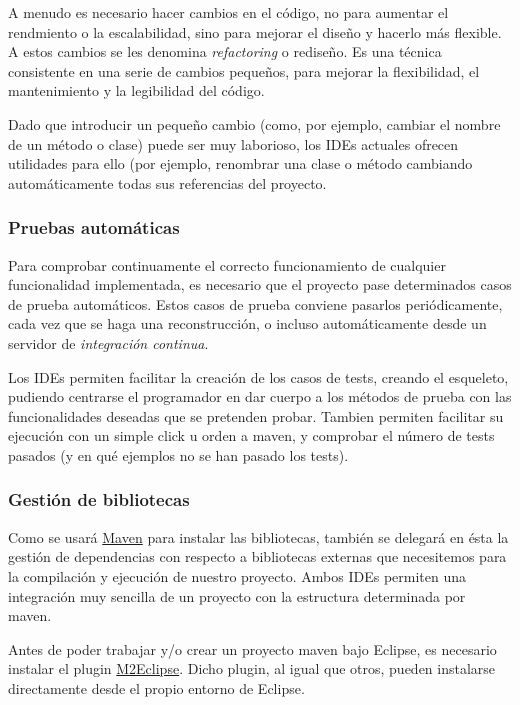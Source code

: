 \documentclass[11pt]{article}
\begin{document}
A menudo es necesario hacer cambios en el código, no para aumentar el rendmiento
o la escalabilidad, sino para mejorar el diseño y hacerlo más flexible. A estos
cambios se les denomina \textit{refactoring} o rediseño. Es una técnica
consistente en una serie de cambios pequeños, para mejorar la flexibilidad, el
mantenimiento y la legibilidad del código.

Dado que introducir un pequeño cambio (como, por ejemplo, cambiar el nombre de
un método o clase) puede ser muy laborioso, los IDEs actuales ofrecen utilidades
para ello (por ejemplo, renombrar una clase o método cambiando automáticamente
todas sus referencias del proyecto.

\subsubsection{Pruebas automáticas} \label{sec-3-2-4}

Para comprobar continuamente el correcto funcionamiento de cualquier
funcionalidad implementada, es necesario que el proyecto pase determinados casos
de prueba automáticos. Estos casos de prueba conviene pasarlos periódicamente,
cada vez que se haga una reconstrucción, o incluso automáticamente desde un
servidor de \emph{integración continua}.

Los IDEs permiten facilitar la creación de los casos de tests, creando el
esqueleto, pudiendo centrarse el programador en dar cuerpo a los métodos de
prueba con las funcionalidades deseadas que se pretenden probar. Tambien
permiten facilitar su ejecución con un simple click u orden a maven, y comprobar
el número de tests pasados (y en qué ejemplos no se han pasado los tests).

\subsubsection{Gestión de bibliotecas} \label{sec-3-2-5}

Como se usará \hyperref[sec-5]{Maven} para instalar las bibliotecas, también se
delegará en ésta la gestión de dependencias con respecto a bibliotecas externas
que necesitemos para la compilación y ejecución de nuestro proyecto. Ambos IDEs
permiten una integración muy sencilla de un proyecto con la estructura
determinada por maven.

Antes de poder trabajar y/o crear un proyecto maven bajo Eclipse, es necesario
instalar el plugin \href{http://m2eclipse.sonatype.org/}{M2Eclipse}. Dicho
plugin, al igual que otros, pueden instalarse directamente desde el propio
entorno de Eclipse.
\end{document}

